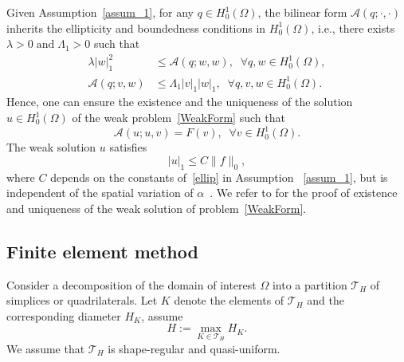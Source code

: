 \documentclass{article}
\begin{document}
Given Assumption~\ref{assum_1}, for any $q \in H_0^1(\Omega)$, the bilinear form $\mathcal{A}(q; \cdot, \cdot)$  inherits the ellipticity and boundedness conditions in $H^1_0(\Omega)$, i.e., there exists $\lambda>0 \;\text{and} \; \Lambda_1>0$ such that
\begin{align*}
    \lambda |w|_1^2 &\leq \mathcal{A}(q;w,w),  \; \; \forall q,w \in H^1_0(\Omega), \\
    \mathcal{A}(q;v,w) &\leq \Lambda_1 |v|_1|w|_1 , \; \; \forall q,v,w \in H^1_0(\Omega).
\end{align*}
Hence, one can ensure the existence and the uniqueness of the solution $u \in H^1_0(\Omega)$ of the weak problem~\eqref{WeakForm} such that 
\begin{equation}\label{eq:weak_Sol}
    \mathcal{A}(u;u,v)=F(v), \; \; \forall  v \in H^1_0(\Omega).
\end{equation}
The weak solution $u$ satisfies 
\begin{equation}\label{UnqueSolution}
    |u|_1 \leq C \|f\|_0,
\end{equation} 
where $C$ depends on the constants of~\eqref{ellip} in Assumption ~\ref{assum_1}, but is independent of the spatial variation of $\alpha$~\cite{chipot}. We refer to \cite{chipot, Douglas,Unique} for the proof of existence and uniqueness of the weak solution of problem~\eqref{WeakForm}.


\subsection{Finite element method}

Consider a decomposition of the domain of interest $\Omega$ into a partition $\mathcal{T}_H$ of simplices or quadrilaterals. Let $K$ denote the elements of $\mathcal{T}_H$ and the corresponding diameter $H_K$, assume  \[H:=\max_{K \in \mathcal{T}_H}H_K.\] 
We assume that $\mathcal{T}_H$ is shape-regular and quasi-uniform. 
\end{document}
